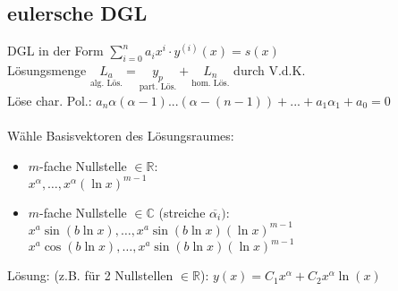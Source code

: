 \documentclass[6pt,a4paper]{scrartcl}
\newcommand{\Ra}[0]{\ensuremath{\Rightarrow}}									%
\newcommand{\R}{\ensuremath{\mathbb R}}
\begin{document}
\begin{multicols}{4}
	\subsection{eulersche DGL}
	DGL in der Form  $\sum\limits_{i=0}^n a_i x^i \cdot y^{(i)}(x) = s(x)$\\
	Lösungsmenge $\underset{\text{alg. Lös.}}{L_a} = \underset{\text{part. Lös.}}{y_p} + \underset{\text{hom. Lös.}}{L_n}$ durch V.d.K.\\
	Löse char. Pol.: $a_n \alpha (\alpha - 1)...(\alpha - (n-1)) + ... + a_1 \alpha_1 + a_0 = 0$\\ \\
	Wähle Basisvektoren des Lösungsraumes:
	\begin{itemize}
		\itemsep-5pt
		\item 	$m$-fache Nullstelle $\in \mathbb R$:  \\
			$x^{\alpha} , \ldots , 	x^{\alpha} (\ln x)^{m-1}$ \\
		\item $m$-fache Nullstelle $\in \mathbb C$ (streiche $\overline{\alpha_i})$:   \\ 
			$x^a \sin(b \ln x), \ldots , x^a \sin(b \ln x) (\ln x)^{m-1}$ \\ 
			$x^a \cos(b \ln x), \ldots , x^a \sin(b \ln x) (\ln x)^{m-1}$
	\end{itemize}
	Lösung: (z.B. für 2 Nullstellen $\in \mathbb R$): $ y(x) = C_1 x^{\alpha} + C_2 x^{\alpha} \ln (x)$	



	

\end{multicols}
\end{document}
